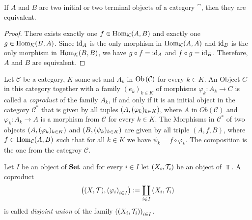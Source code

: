 \begin{theorem} \cite[p. 83]{Alg1&2}
	If $A$ and $B$ are two initial or two terminal objects of a category $\cat$, then they are equivalent. 
\end{theorem}
\begin{proof}
	There exists exactly one $f \in \operatorname{Hom}_\mathcal K(A, B)$ and exactly one $g \in \operatorname{Hom}_\mathcal K(B,A)$. Since $\operatorname{id}_A$ is the only morphism in $\operatorname{Hom}_\mathcal K(A, A)$ and $\operatorname{id}_B$ is the only morphism in $\operatorname{Hom}_\mathcal K(B, B)$, we have $g \circ f = \operatorname{id}_A$ and $f \circ g = \operatorname{id}_B$. Therefore, $A$ and $B$ are equivalent. 
\end{proof}

\begin{definition}
	Let $\mathcal{C}$ be a category, $K$ some set and $A_k$ in $\operatorname{Ob}{\left ( \mathcal{C} \right )}$ for every $k \in K$. An Object $C$ in this category together with a family $(e_k)_{k \in K}$ of morphisms $\varphi_k: A_k \to C$ is called a \textit{coproduct} of the family $A_k$, if and only if it is an initial object in the category $\mathcal{C}^\ast$ that is given by all tuples ${\left ( A, (\varphi_k)_{k \in K} \right )}$, where $A$ in $Ob(\mathcal{C})$ and $\varphi_k: A_k \to A$ is a morphism from $\mathcal{C}$ for every $k \in K$. The Morphisms in $\mathcal{C}^\ast$ of two objects ${\left ( A, (\varphi_k)_{k \in K} \right )}$ and ${\left ( B, (\psi_k)_{k \in K} \right )}$ are given by all triple $(A, f, B)$, where $f \in \operatorname{Hom}_\mathcal C(A, B)$ such that for all $k \in K$ we have $\psi_k = f \circ \varphi_k$. The composition is the one from the categroy $\mathcal{C}$. 
\end{definition}


\begin{definition}
	Let $I$ be an object of $\mathbf{Set}$ and for every $i \in I$ let ${\left ( X_i, \mathcal{T}_i \right )}$ be an object of $\Top$. A coproduct 
	\begin{align*}
	\pbraces{\tspace, \pbraces{\varphi_i}_{i \in I}} := \coprod_{i \in I} \pbraces{X_i, \mathcal{T}_i}
	\end{align*}
	is called \textit{disjoint union} of the family ${\left ( {\left ( X_i, \mathcal{T}_i \right )} \right )}_{i \in I}$.
\end{definition}

